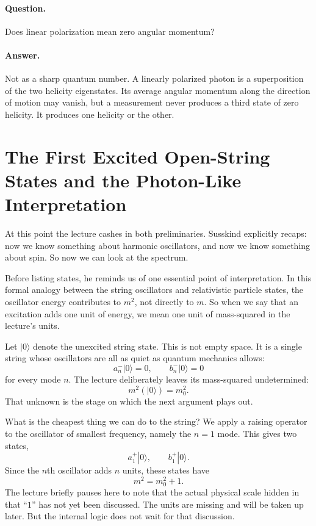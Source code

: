 \paragraph{Question.} Does linear polarization mean zero angular momentum?

\paragraph{Answer.} Not as a sharp quantum number. A linearly polarized photon is a superposition of the two helicity eigenstates. Its average angular momentum along the direction of motion may vanish, but a measurement never produces a third state of zero helicity. It produces one helicity or the other.

\section{The First Excited Open-String States and the Photon-Like Interpretation}

At this point the lecture cashes in both preliminaries. Susskind explicitly recaps: now we know something about harmonic oscillators, and now we know something about spin. So now we can look at the spectrum.

Before listing states, he reminds us of one essential point of interpretation. In this formal analogy between the string oscillators and relativistic particle states, the oscillator energy contributes to \(m^2\), not directly to \(m\). So when we say that an excitation adds one unit of energy, we mean one unit of mass-squared in the lecture's units.

Let \(|0\rangle\) denote the unexcited string state. This is not empty space. It is a single string whose oscillators are all as quiet as quantum mechanics allows:
\begin{equation}
a_n^-|0\rangle=0,\qquad b_n^-|0\rangle=0
\end{equation}
for every mode \(n\). The lecture deliberately leaves its mass-squared undetermined:
\begin{equation}
m^2(|0\rangle)=m_0^2.
\end{equation}
That unknown is the stage on which the next argument plays out.

What is the cheapest thing we can do to the string? We apply a raising operator to the oscillator of smallest frequency, namely the \(n=1\) mode. This gives two states,
\begin{equation}
a_1^+|0\rangle,\qquad b_1^+|0\rangle.
\end{equation}
Since the \(n\)th oscillator adds \(n\) units, these states have
\begin{equation}
m^2=m_0^2+1.
\end{equation}
The lecture briefly pauses here to note that the actual physical scale hidden in that ``\(1\)'' has not yet been discussed. The units are missing and will be taken up later. But the internal logic does not wait for that discussion.

